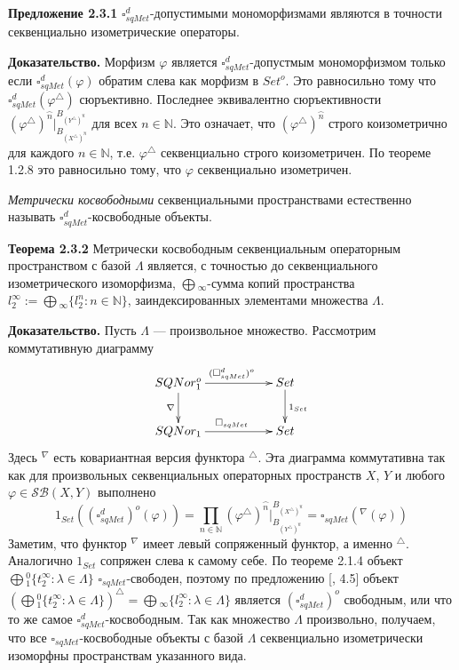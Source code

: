 \documentclass[12pt]{article}
\begin{document}
{\bf Предложение 2.3.1} $\square_{sqMet}^d$-допустимыми мономорфизмами являются
в точности секвенциально  изометрические операторы.

{\bf Доказательство.}  Морфизм $\varphi$ является $\square_{sqMet}^d$-допустмым
мономорфизмом только если $\square_{sqMet}^d(\varphi)$ обратим слева как морфизм
в $Set^o$. Это равносильно тому что $\square_{sqMet}^d(\varphi^\triangle)$
сюръективно. Последнее эквивалентно  сюръективности
${(\varphi^\triangle)}^{\wideparen{n}}|_{
    B_{{(X^\triangle)}^{\wideparen{n}}}
}^{
    B_{{(Y^\triangle)}^{\wideparen{n}}}
}$
для всех $n\in\mathbb{N}$. Это означает, что
${(\varphi^\triangle)}^{\wideparen{n}}$ строго коизометрично для каждого
$n\in\mathbb{N}$, т.е. $\varphi^\triangle$ секвенциально строго коизометричен.
По теореме 1.2.8 это равносильно тому, что $\varphi$ секвенциально изометричен.

\medskip

\textit{Метрически косвободными} секвенциальными пространствами естественно
называть $\square_{sqMet}^d$-косвободные объекты.

\medskip

{\bf Теорема 2.3.2} Метрически косвободным секвенциальным операторным
пространством с базой $\Lambda$ является, с точностью до секвенциального
изометрического изоморфизма, $\bigoplus{}_\infty$-сумма копий пространства
$l_2^\infty:=\bigoplus{}_\infty \{l_2^n:n\in\mathbb{N} \}$, заиндексированных
элементами множества $\Lambda$.

{\bf Доказательство.}  Пусть $\Lambda$ --- произвольное множество. Рассмотрим
коммутативную диаграмму
$$
\xymatrix{
SQNor_1^o \ar[d]_{\nabla }  %
\ar[rr]^{(\square_{sqMet}^{d})^o} & & {Set}\ar[d]^{1_{Set}}\\  %
SQNor_1
\ar[rr]^{\square_{sqMet}}&  &{Set}}  %
$$
Здесь ${}^\nabla$ есть ковариантная версия функтора ${}^\triangle$. Эта
диаграмма коммутативна так как для произвольных секвенциальных операторных
пространств $X$, $Y$ и любого $\varphi\in\mathcal{SB}(X,Y)$ выполнено
$$
1_{Set}({(\square_{sqMet}^d)}^o(\varphi))
=\prod\limits_{n\in\mathbb{N}} 
{(\varphi^\triangle )}^{\wideparen{n}}|_{
    B_{{(Y^\triangle )}^{\wideparen{n}}}
}^{
    B_{{(X^\triangle )}^{\wideparen{n}}}
}
=\square_{sqMet}({}^\nabla(\varphi))
$$
Заметим, что функтор ${}^\nabla$ имеет левый сопряженный функтор, а именно
${}^\triangle$. Аналогично $1_{Set}$ сопряжен слева к самому себе. По теореме
2.1.4 объект $\bigoplus{}_1^0 \{t_2^\infty:\lambda\in\Lambda \}$
$\square_{sqMet}$-свободен, поэтому по предложению [\cite{HelMetrFrQmod}, 4.5]
объект
${(\bigoplus{}_1^0 \{t_2^\infty:\lambda\in\Lambda \})}^\triangle
=\bigoplus{}_\infty \{l_2^\infty:\lambda\in\Lambda \}$
является ${(\square_{sqMet}^d)}^o$ свободным, или что то же самое
$\square_{sqMet}^d$-косвободным. Так как множество $\Lambda$ произвольно,
получаем, что все $\square_{sqMet}$-косвободные объекты с базой $\Lambda$
секвенциально изометрически изоморфны пространствам указанного вида.
\end{document}
